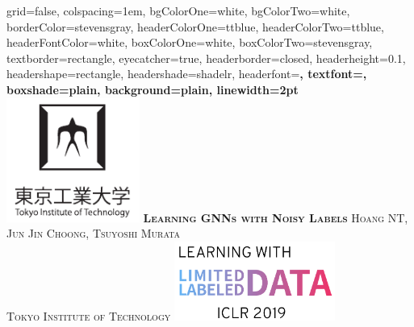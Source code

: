 \documentclass[portrait,final,archD,fontscale=0.477]{baposter}
\begin{document}


\begin{poster}%
  {
  grid=false,
  colspacing=1em,
  bgColorOne=white,
  bgColorTwo=white,
  borderColor=stevensgray,
  headerColorOne=ttblue,
  headerColorTwo=ttblue,
  headerFontColor=white,
  boxColorOne=white,
  boxColorTwo=stevensgray,
  textborder=rectangle,
  eyecatcher=true,
  headerborder=closed,
  headerheight=0.1\textheight,
  headershape=rectangle,
  headershade=shadelr,
  headerfont=\Large\bf\textsc, %
  textfont={\setlength{\parindent}{1.5em}},
  boxshade=plain,
  background=plain,
  linewidth=2pt
  }
  {%
    \includegraphics[height=11.0em]{img/tokyotech_logo}
  }
  {\bf \textsc{Learning GNNs with Noisy Labels} }
  {\textsc{ Hoang NT, Jun Jin Choong, Tsuyoshi Murata \\ Tokyo Institute of Technology}}
  {%
    \includegraphics[height=7.0em]{img/lld_logo}
  }


\end{poster}
\end{document}
